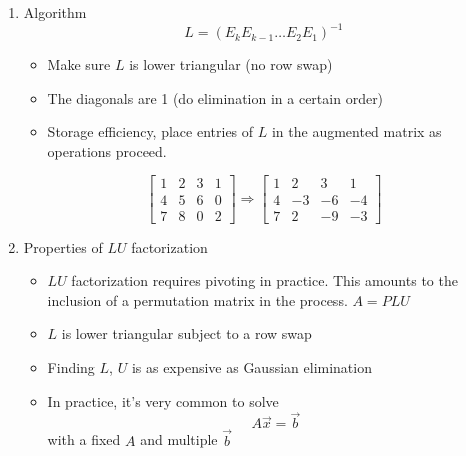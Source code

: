 \documentclass{article}
\theoremstyle{remark}
\begin{document}
\begin{enumerate}
\begin{enumerate}
\[\begin{array}{ccc}
 0 & 0 & 1 
\end{array}\right]
\left[\begin{array}{ccc}  
 1 & 2 & 3 \\  
 4 & 5 & 6  \\
 7 & 8 & 0 
\end{array}\right]
= 
\left[\begin{array}{ccc}  
 1 & 2 & 3 \\  
 0 & -3 & -6  \\
 0 & 0 & -9
\end{array}\right] = U
\]
Inverting elementary matrices is easy. Fill in the blank:
\[
E_1^{-1} E_1 = 
\left[\begin{array}{ccc}  
 1 & 0 & 0 \\  
 4 & 1 & 0  \\
 0 & 0 & 1 
\end{array}\right]
\left[\begin{array}{ccc}  
 1 & 0 & 0 \\  
 -4 & 1 & 0  \\
 0 & 0 & 1 
\end{array}\right]=I
\]
Whence,
\[
A = (E_3E_2E_1)^{-1} U = E_1^{-1} E_2^{-1} E_3^{-1} U = LU
\]

\item Algorithm
$$
L = (E_kE_{k-1}\dots E_2E_1)^{-1}
$$
\begin{itemize}
\item Make sure $L$ is lower triangular (no row swap)
\item The diagonals are 1 (do elimination in a certain order)
\item Storage efficiency, place entries of $L$ in the augmented matrix as operations proceed.
\end{itemize}
\[
\left[\begin{array}{ccc|c}  
 1 & 2 & 3 & 1\\  
 4 & 5 & 6 & 0 \\
 7 & 8 & 0 & 2
\end{array}\right]
\Rightarrow
\left[\begin{array}{ccc|c}  
 1 & 2 & 3 & 1\\  
 4 & -3 & -6 & -4 \\
 7 & 2 & -9 & -3
\end{array}\right]
\]

\item Properties of $LU$ factorization
\begin{itemize}
\item $LU$ factorization requires pivoting in practice. This amounts to the inclusion of a permutation matrix in the process. $A=PLU$ 
\item $L$ is lower triangular subject to a row swap
\item Finding $L$, $U$ is as expensive as Gaussian elimination
\item In practice, it's very common to solve
$$
A\vec x = \vec b
$$
with a fixed $A$ and multiple $\vec b$
\end{itemize}
\end{enumerate}


\end{enumerate}
\end{document}
